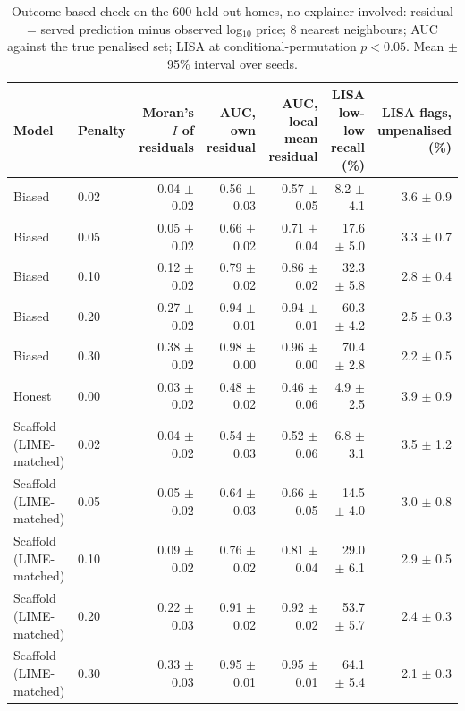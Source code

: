 \begin{table}[t]
\centering
\footnotesize
\setlength{\tabcolsep}{3.5pt}
\begin{adjustbox}{max width=\linewidth}
\begin{tabular}{llrrrrr}
\toprule
Model & Penalty & \makecell[b]{Moran's $I$ \\ of residuals} & \makecell[b]{AUC, own \\ residual} & \makecell[b]{AUC, local \\ mean residual} & \makecell[b]{LISA low-low \\ recall (\%)} & \makecell[b]{LISA flags, \\ unpenalised \\ (\%)} \\
\midrule
Biased & 0.02 & 0.04 $\pm$ 0.02 & 0.56 $\pm$ 0.03 & 0.57 $\pm$ 0.05 & 8.2 $\pm$ 4.1 & 3.6 $\pm$ 0.9 \\
Biased & 0.05 & 0.05 $\pm$ 0.02 & 0.66 $\pm$ 0.02 & 0.71 $\pm$ 0.04 & 17.6 $\pm$ 5.0 & 3.3 $\pm$ 0.7 \\
Biased & 0.10 & 0.12 $\pm$ 0.02 & 0.79 $\pm$ 0.02 & 0.86 $\pm$ 0.02 & 32.3 $\pm$ 5.8 & 2.8 $\pm$ 0.4 \\
Biased & 0.20 & 0.27 $\pm$ 0.02 & 0.94 $\pm$ 0.01 & 0.94 $\pm$ 0.01 & 60.3 $\pm$ 4.2 & 2.5 $\pm$ 0.3 \\
Biased & 0.30 & 0.38 $\pm$ 0.02 & 0.98 $\pm$ 0.00 & 0.96 $\pm$ 0.00 & 70.4 $\pm$ 2.8 & 2.2 $\pm$ 0.5 \\
Honest & 0.00 & 0.03 $\pm$ 0.02 & 0.48 $\pm$ 0.02 & 0.46 $\pm$ 0.06 & 4.9 $\pm$ 2.5 & 3.9 $\pm$ 0.9 \\
Scaffold (LIME-matched) & 0.02 & 0.04 $\pm$ 0.02 & 0.54 $\pm$ 0.03 & 0.52 $\pm$ 0.06 & 6.8 $\pm$ 3.1 & 3.5 $\pm$ 1.2 \\
Scaffold (LIME-matched) & 0.05 & 0.05 $\pm$ 0.02 & 0.64 $\pm$ 0.03 & 0.66 $\pm$ 0.05 & 14.5 $\pm$ 4.0 & 3.0 $\pm$ 0.8 \\
Scaffold (LIME-matched) & 0.10 & 0.09 $\pm$ 0.02 & 0.76 $\pm$ 0.02 & 0.81 $\pm$ 0.04 & 29.0 $\pm$ 6.1 & 2.9 $\pm$ 0.5 \\
Scaffold (LIME-matched) & 0.20 & 0.22 $\pm$ 0.03 & 0.91 $\pm$ 0.02 & 0.92 $\pm$ 0.02 & 53.7 $\pm$ 5.7 & 2.4 $\pm$ 0.3 \\
Scaffold (LIME-matched) & 0.30 & 0.33 $\pm$ 0.03 & 0.95 $\pm$ 0.01 & 0.95 $\pm$ 0.01 & 64.1 $\pm$ 5.4 & 2.1 $\pm$ 0.3 \\
\bottomrule
\end{tabular}
\end{adjustbox}
\caption{Outcome-based check on the 600 held-out homes, no explainer involved: residual = served prediction minus observed log$_{10}$ price; 8 nearest neighbours; AUC against the true penalised set; LISA at conditional-permutation $p<0.05$. Mean $\pm$ 95\% interval over seeds.}
\label{tab:e7}
\end{table}
